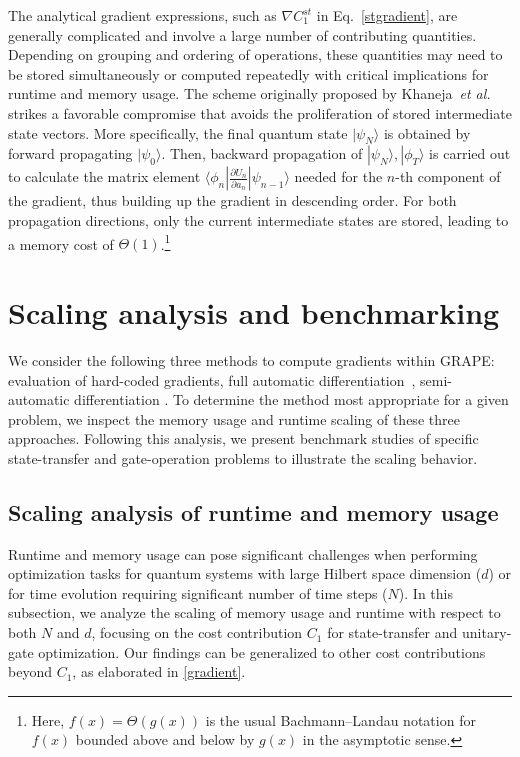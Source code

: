 \documentclass[letterpaper,10pt]{iopart}
\newcommand{\dket}[1]{|#1\rangle}
\begin{document}
The analytical gradient expressions, such as $\nabla C_1^{st}$ in Eq.\ \eqref{stgradient}, are generally complicated and involve a large number of contributing quantities. Depending on grouping and ordering of operations, these quantities may need to be stored simultaneously or computed repeatedly with critical implications for runtime and memory usage. The scheme originally proposed by Khaneja\ \textit{et al.}\ \cite{nmrkhaneja2005optimal} strikes a favorable compromise that avoids the proliferation of stored intermediate state vectors. More specifically, the final quantum state $\dket{\psi_N}$ is obtained by forward propagating $\dket{\psi_0}$. Then, backward propagation of $\dket{\psi_N},\dket{\phi_T}$ is carried out to calculate the matrix element $\langle\phi_{n}|\frac {\partial U_n }{\partial a_{n}}|\psi_{n-1}\rangle$ needed for the $n$-th component of the gradient, thus building up the gradient in descending order. For both propagation directions, only the current intermediate states are stored, leading to a memory cost of $\Theta(1)$.\footnote{Here, $f(x)=\Theta
(g(x))$ is the usual Bachmann–Landau notation for $f(x)$ bounded above and below by $g(x)$ in the asymptotic sense.}

\section{Scaling analysis and benchmarking}
\label{Scaling analysis and benchmarking}
We consider the following three methods to compute gradients within GRAPE: evaluation of hard-coded gradients, full automatic differentiation\ \cite{pacleung2017speedup}, semi-automatic differentiation \cite{semiadgoerz2022quantum}. To determine the method most appropriate for a given problem, we inspect the memory usage and runtime scaling of these three approaches. Following this analysis, we present benchmark studies of specific state-transfer and gate-operation problems to illustrate the scaling behavior.
\subsection{Scaling analysis of runtime and memory usage}
\label{scaling analysis}
Runtime and memory usage can pose significant challenges when performing optimization tasks for quantum systems with large Hilbert space dimension ($d$) or for time evolution requiring significant number of time steps ($N$). In this subsection, we analyze the scaling of memory usage and runtime with respect to both $N$ and $d$, focusing on the cost contribution $C_1$ for state-transfer and unitary-gate optimization. Our findings can be generalized to other cost contributions beyond $C_1$, as elaborated in \ref{gradient}.
\end{document}
